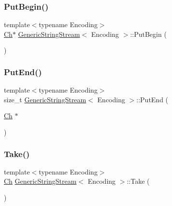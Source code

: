 \mbox{\label{structGenericStringStream_a88c908b4dac9773240ce4bca4b6dd837}} 
\subsubsection{\texorpdfstring{Put\+Begin()}{PutBegin()}}
{\footnotesize\ttfamily template$<$typename Encoding$>$ \\
\hyperlink{structGenericStringStream_a4289aca895330084ff3168e37e4f08bd}{Ch}$\ast$ \hyperlink{structGenericStringStream}{Generic\+String\+Stream}$<$ Encoding $>$\+::Put\+Begin (\begin{DoxyParamCaption}{ }\end{DoxyParamCaption})\hspace{0.3cm}{\ttfamily [inline]}}

\mbox{\label{structGenericStringStream_a07b942bacda494afb3b2f7629cef14af}} 
\subsubsection{\texorpdfstring{Put\+End()}{PutEnd()}}
{\footnotesize\ttfamily template$<$typename Encoding$>$ \\
size\+\_\+t \hyperlink{structGenericStringStream}{Generic\+String\+Stream}$<$ Encoding $>$\+::Put\+End (\begin{DoxyParamCaption}\item[{\hyperlink{structGenericStringStream_a4289aca895330084ff3168e37e4f08bd}{Ch} $\ast$}]{ }\end{DoxyParamCaption})\hspace{0.3cm}{\ttfamily [inline]}}

\mbox{\label{structGenericStringStream_a0d26e3e77e4fca64a87c2d71f48ac5e5}} 
\subsubsection{\texorpdfstring{Take()}{Take()}}
{\footnotesize\ttfamily template$<$typename Encoding$>$ \\
\hyperlink{structGenericStringStream_a4289aca895330084ff3168e37e4f08bd}{Ch} \hyperlink{structGenericStringStream}{Generic\+String\+Stream}$<$ Encoding $>$\+::Take (\begin{DoxyParamCaption}{ }\end{DoxyParamCaption})\hspace{0.3cm}{\ttfamily [inline]}}

